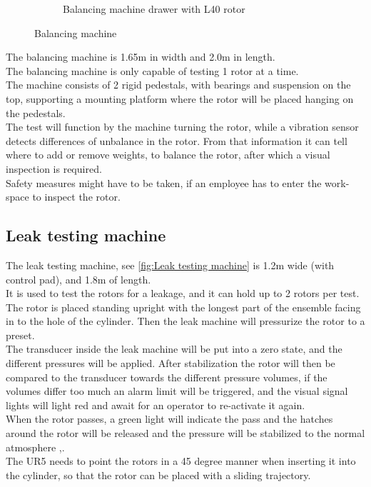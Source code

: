 \begin{figure}[H]
\begin{subfigure}{.49\textwidth}
        \caption{Balancing machine drawer with L40 rotor}
        \label{fig:Rotor} 
    \end{subfigure}
\caption{Balancing machine\cite{Case}}
\label{fig:BalancingMachine}
\end{figure}

 The balancing machine is 1.65m in width and 2.0m in length.\\
 The balancing machine is only capable of testing 1 rotor at a time.\\
 The machine consists of 2 rigid pedestals, with bearings and suspension on the top, supporting a mounting platform where the rotor will be placed hanging on the pedestals. \\

The test will function by the machine turning the rotor, while a vibration sensor detects differences of unbalance in the rotor. From that information it can tell where to add or remove weights, to balance the rotor, after which a visual inspection is required. \\

Safety measures might have to be taken, if an employee has to enter the work-space to inspect the rotor. \\
 


 \subsection{Leak testing machine}
 
 The leak testing machine, see \ref{fig:Leak testing machine} is 1.2m wide (with control pad), and 1.8m of length.\\ 
 It is used to test the rotors for a leakage, and it can hold up to 2 rotors per test.\\
 The rotor is placed standing upright with the longest part of the ensemble facing in to the hole of the cylinder. Then the leak machine will pressurize the rotor to a preset.\\
 The transducer inside the leak machine will be put into a zero state, and the different pressures will be applied. After stabilization the rotor will then be compared to the transducer towards the different pressure volumes, if the volumes differ too much an alarm limit will be triggered, and the visual signal lights will light red and await for an operator to re-activate it again. \\
 When the rotor passes, a green light will indicate the pass and the hatches around the rotor will be released and the pressure will be stabilized to the normal atmosphere  \cite{LEAK},\cite{LEAK2}. \\
 The UR5 needs to point the rotors in a 45 degree manner when inserting it into the cylinder, so that the rotor can be placed with a sliding trajectory. \\
 
